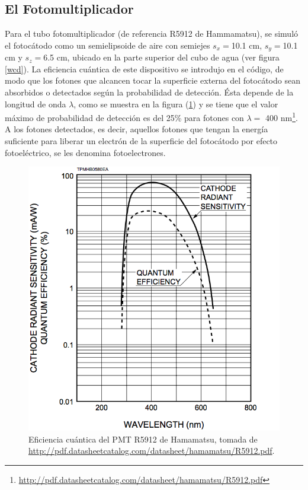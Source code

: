 \documentclass[12pt,oneside,openany,letter]{book}
\begin{document}
\subsection{El Fotomultiplicador}
Para el tubo fotomultiplicador (de referencia R5912 de Hammamatsu), se simuló el fotocátodo como un semielipsoide de aire con semiejes $s_x=$10.1 cm, $s_y=$10.1 cm y $s_z=$6.5 cm, ubicado en la parte superior del cubo de agua (ver figura \ref{wcd}). La eficiencia cuántica de este dispositivo se introdujo en el código, de modo que los fotones que alcancen tocar la superficie externa del fotocátodo sean absorbidos o detectados según la probabilidad de detección. \'Esta depende de la longitud de onda $\lambda$, como se muestra en la figura (\ref{QEPMT}) y se tiene que el valor máximo de probabilidad de detección es del 25\% para fotones con $\lambda =$ 400 nm\footnote{\url{http://pdf.datasheetcatalog.com/datasheet/hamamatsu/R5912.pdf}}. A los fotones detectados, es decir, aquellos fotones que tengan la energía suficiente para liberar un electrón de la superficie del fotoc\'atodo por efecto fotoeléctrico, se les denomina fotoelectrones.
\begin{figure}[h!]
    \centering
        \includegraphics[scale=0.35]{images/QEPMT.png}
   \caption[Eficiencia cuántica del PMT R5912 de Hamamatsu]{Eficiencia cuántica del PMT R5912 de Hamamatsu, tomada de \url{http://pdf.datasheetcatalog.com/datasheet/hamamatsu/R5912.pdf}.}\label{QEPMT}
\end{figure}
\end{document}
